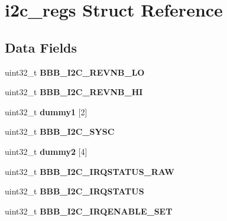 \hypertarget{structi2c__regs}{}\section{i2c\+\_\+regs Struct Reference}
\label{structi2c__regs}
\subsection*{Data Fields}
\begin{DoxyCompactItemize}
\item 
\mbox{\label{structi2c__regs_adb094cd5c7d03bfb7f24388c661a2367}} 
uint32\+\_\+t {\bfseries B\+B\+B\+\_\+\+I2\+C\+\_\+\+R\+E\+V\+N\+B\+\_\+\+LO}
\item 
\mbox{\label{structi2c__regs_aa0807b0b147e365ebcbdc7ec87113df0}} 
uint32\+\_\+t {\bfseries B\+B\+B\+\_\+\+I2\+C\+\_\+\+R\+E\+V\+N\+B\+\_\+\+HI}
\item 
\mbox{\label{structi2c__regs_a580ca827c6d9ef06a51ab3c8e47cf74c}} 
uint32\+\_\+t {\bfseries dummy1} \mbox{[}2\mbox{]}
\item 
\mbox{\label{structi2c__regs_ab7a7452af24b95be2d71aa9f1d68a0b2}} 
uint32\+\_\+t {\bfseries B\+B\+B\+\_\+\+I2\+C\+\_\+\+S\+Y\+SC}
\item 
\mbox{\label{structi2c__regs_a4030e75606cd005cbf747029d76b1b62}} 
uint32\+\_\+t {\bfseries dummy2} \mbox{[}4\mbox{]}
\item 
\mbox{\label{structi2c__regs_a26e7634e33fbe26415e7e9c0cf21126e}} 
uint32\+\_\+t {\bfseries B\+B\+B\+\_\+\+I2\+C\+\_\+\+I\+R\+Q\+S\+T\+A\+T\+U\+S\+\_\+\+R\+AW}
\item 
\mbox{\label{structi2c__regs_a71f8ccd55d1f904ae5e972b7073186ad}} 
uint32\+\_\+t {\bfseries B\+B\+B\+\_\+\+I2\+C\+\_\+\+I\+R\+Q\+S\+T\+A\+T\+US}
\item 
\mbox{\label{structi2c__regs_ad18b374843d7c0960b75624f05f580fc}} 
uint32\+\_\+t {\bfseries B\+B\+B\+\_\+\+I2\+C\+\_\+\+I\+R\+Q\+E\+N\+A\+B\+L\+E\+\_\+\+S\+ET}
\item 
\mbox{\label{structi2c__regs_a9b24e353065cd2b3be4690c0a432acbe}} 

\end{DoxyCompactItemize}
